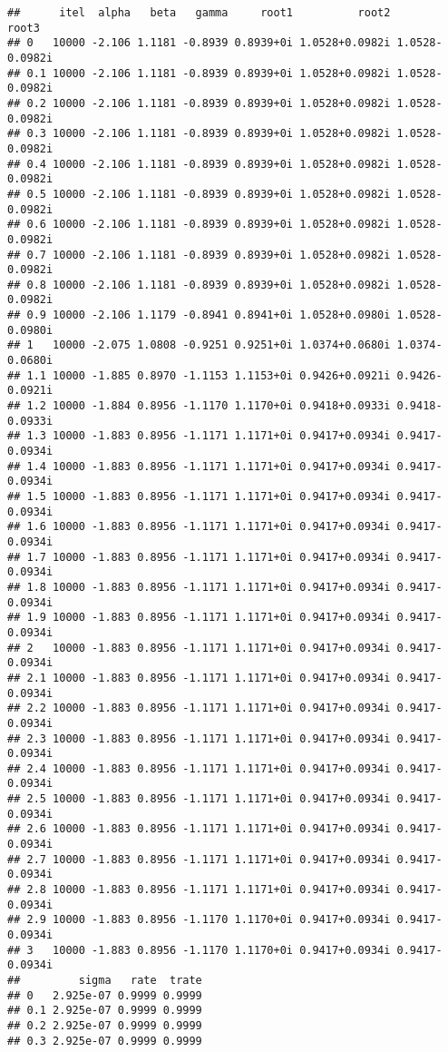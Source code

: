 \documentclass[
  12pt,
]{article}
\begin{document}
\begin{verbatim}
##      itel  alpha   beta   gamma     root1          root2          root3
## 0   10000 -2.106 1.1181 -0.8939 0.8939+0i 1.0528+0.0982i 1.0528-0.0982i
## 0.1 10000 -2.106 1.1181 -0.8939 0.8939+0i 1.0528+0.0982i 1.0528-0.0982i
## 0.2 10000 -2.106 1.1181 -0.8939 0.8939+0i 1.0528+0.0982i 1.0528-0.0982i
## 0.3 10000 -2.106 1.1181 -0.8939 0.8939+0i 1.0528+0.0982i 1.0528-0.0982i
## 0.4 10000 -2.106 1.1181 -0.8939 0.8939+0i 1.0528+0.0982i 1.0528-0.0982i
## 0.5 10000 -2.106 1.1181 -0.8939 0.8939+0i 1.0528+0.0982i 1.0528-0.0982i
## 0.6 10000 -2.106 1.1181 -0.8939 0.8939+0i 1.0528+0.0982i 1.0528-0.0982i
## 0.7 10000 -2.106 1.1181 -0.8939 0.8939+0i 1.0528+0.0982i 1.0528-0.0982i
## 0.8 10000 -2.106 1.1181 -0.8939 0.8939+0i 1.0528+0.0982i 1.0528-0.0982i
## 0.9 10000 -2.106 1.1179 -0.8941 0.8941+0i 1.0528+0.0980i 1.0528-0.0980i
## 1   10000 -2.075 1.0808 -0.9251 0.9251+0i 1.0374+0.0680i 1.0374-0.0680i
## 1.1 10000 -1.885 0.8970 -1.1153 1.1153+0i 0.9426+0.0921i 0.9426-0.0921i
## 1.2 10000 -1.884 0.8956 -1.1170 1.1170+0i 0.9418+0.0933i 0.9418-0.0933i
## 1.3 10000 -1.883 0.8956 -1.1171 1.1171+0i 0.9417+0.0934i 0.9417-0.0934i
## 1.4 10000 -1.883 0.8956 -1.1171 1.1171+0i 0.9417+0.0934i 0.9417-0.0934i
## 1.5 10000 -1.883 0.8956 -1.1171 1.1171+0i 0.9417+0.0934i 0.9417-0.0934i
## 1.6 10000 -1.883 0.8956 -1.1171 1.1171+0i 0.9417+0.0934i 0.9417-0.0934i
## 1.7 10000 -1.883 0.8956 -1.1171 1.1171+0i 0.9417+0.0934i 0.9417-0.0934i
## 1.8 10000 -1.883 0.8956 -1.1171 1.1171+0i 0.9417+0.0934i 0.9417-0.0934i
## 1.9 10000 -1.883 0.8956 -1.1171 1.1171+0i 0.9417+0.0934i 0.9417-0.0934i
## 2   10000 -1.883 0.8956 -1.1171 1.1171+0i 0.9417+0.0934i 0.9417-0.0934i
## 2.1 10000 -1.883 0.8956 -1.1171 1.1171+0i 0.9417+0.0934i 0.9417-0.0934i
## 2.2 10000 -1.883 0.8956 -1.1171 1.1171+0i 0.9417+0.0934i 0.9417-0.0934i
## 2.3 10000 -1.883 0.8956 -1.1171 1.1171+0i 0.9417+0.0934i 0.9417-0.0934i
## 2.4 10000 -1.883 0.8956 -1.1171 1.1171+0i 0.9417+0.0934i 0.9417-0.0934i
## 2.5 10000 -1.883 0.8956 -1.1171 1.1171+0i 0.9417+0.0934i 0.9417-0.0934i
## 2.6 10000 -1.883 0.8956 -1.1171 1.1171+0i 0.9417+0.0934i 0.9417-0.0934i
## 2.7 10000 -1.883 0.8956 -1.1171 1.1171+0i 0.9417+0.0934i 0.9417-0.0934i
## 2.8 10000 -1.883 0.8956 -1.1171 1.1171+0i 0.9417+0.0934i 0.9417-0.0934i
## 2.9 10000 -1.883 0.8956 -1.1170 1.1170+0i 0.9417+0.0934i 0.9417-0.0934i
## 3   10000 -1.883 0.8956 -1.1170 1.1170+0i 0.9417+0.0934i 0.9417-0.0934i
##         sigma   rate  trate
## 0   2.925e-07 0.9999 0.9999
## 0.1 2.925e-07 0.9999 0.9999
## 0.2 2.925e-07 0.9999 0.9999
## 0.3 2.925e-07 0.9999 0.9999

\end{verbatim}
\end{document}
